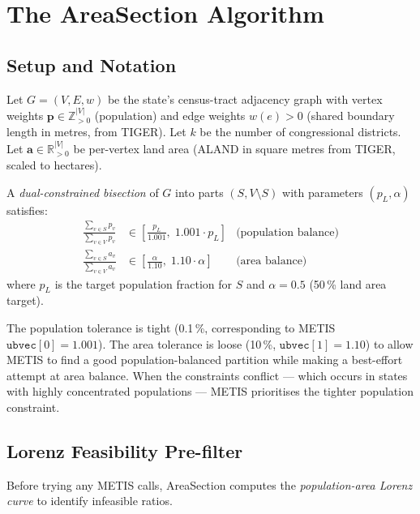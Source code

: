 \section{The AreaSection Algorithm}
\label{sec:algorithm}

\subsection{Setup and Notation}

Let $G = (V, E, w)$ be the state's census-tract adjacency graph with vertex
weights $\mathbf{p} \in \mathbb{Z}_{>0}^{|V|}$ (population) and edge weights
$w(e) > 0$ (shared boundary length in metres, from TIGER).
Let $k$ be the number of congressional districts.
Let $\mathbf{a} \in \mathbb{R}_{>0}^{|V|}$ be per-vertex land area (ALAND
in square metres from TIGER, scaled to hectares).

\begin{definition}
A \emph{dual-constrained bisection} of $G$ into parts $(S, V \setminus S)$
with parameters $(p_L, \alpha)$ satisfies:
\begin{align}
  \frac{\sum_{v \in S} p_v}{\sum_{v \in V} p_v} &\in \left[\frac{p_L}{1.001},\; 1.001 \cdot p_L\right]
    & \text{(population balance)} \\
  \frac{\sum_{v \in S} a_v}{\sum_{v \in V} a_v} &\in \left[\frac{\alpha}{1.10},\; 1.10 \cdot \alpha\right]
    & \text{(area balance)}
\end{align}
where $p_L$ is the target population fraction for $S$ and $\alpha = 0.5$
(50\,\% land area target).
\end{definition}

The population tolerance is tight (0.1\,\%, corresponding to METIS
$\mathtt{ubvec}[0] = 1.001$).
The area tolerance is loose (10\,\%, $\mathtt{ubvec}[1] = 1.10$) to allow
METIS to find a good population-balanced partition while making a best-effort
attempt at area balance.
When the constraints conflict --- which occurs in states with highly
concentrated populations --- METIS prioritises the tighter population
constraint.

\subsection{Lorenz Feasibility Pre-filter}

Before trying any METIS calls, AreaSection computes the
\emph{population-area Lorenz curve} to identify infeasible ratios.

